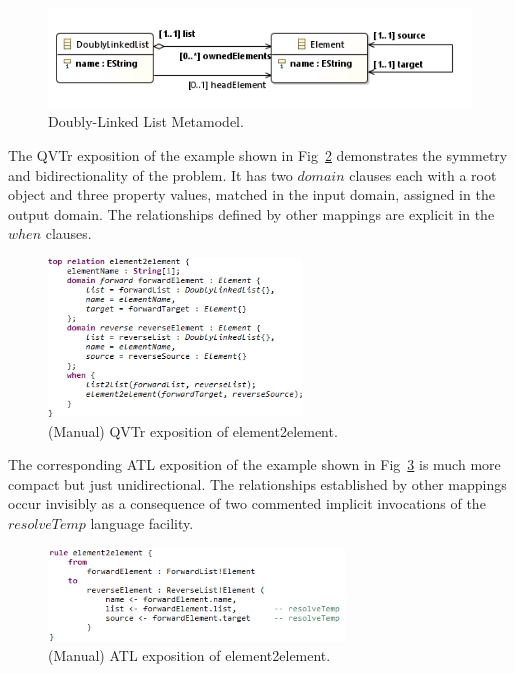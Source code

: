 \documentclass{llncs}
\begin{document}
\begin{figure}[h]
	\centering
	\includegraphics[width=1.0\textwidth]{doublylinkedlist.png}
	\caption{Doubly-Linked List Metamodel.}
	\label{fig:doublylinkedlist}
\end{figure}

The QVTr exposition of the example shown in Fig~\ref{fig:QVTrelement2element} demonstrates the symmetry and bidirectionality of the problem. It has two $domain$ clauses each with a root object and three property values, matched in the input domain, assigned in the output domain. The relationships defined by other mappings are explicit in the $when$ clauses.

\begin{figure}[h]
	\centering
	\includegraphics[width=0.6\textwidth]{QVTrelement2element.png}
	\caption{(Manual) QVTr exposition of element2element.}
	\label{fig:QVTrelement2element}
\end{figure}

The corresponding ATL \cite{Eclipse-ATL} exposition of the example shown in Fig~\ref{fig:ATLelement2element} is much more compact but just unidirectional. The relationships established by other mappings occur invisibly as a consequence of two commented implicit invocations of the $resolveTemp$ language facility.

\begin{figure}[h]
	\centering
	\includegraphics[width=0.7\textwidth]{ATLelement2element.png}
	\caption{(Manual) ATL exposition of element2element.}
	\label{fig:ATLelement2element}
\end{figure}
\end{document}
